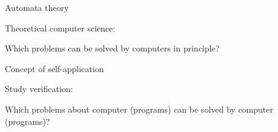 \documentclass[../talk.tex]{subfiles}
\begin{document}
\begin{frame}{Automata theory}
    \begin{overlayarea}{\slidewidth}{\slideheight}
        \alert{Theoretical computer science}:
            \begin{center}
                Which problems can be solved by computers in principle?
            \end{center}

        {%
            Concept of \alert{self-application}

            \vspace*{1em}
        }

        {%
            Study \alert{verification}:

            \begin{center}
                Which problems about computer (programs)%
                \newline%
                can be solved by computer (programs)?
            \end{center}
        }
    \end{overlayarea}
\end{frame}
\end{document}
